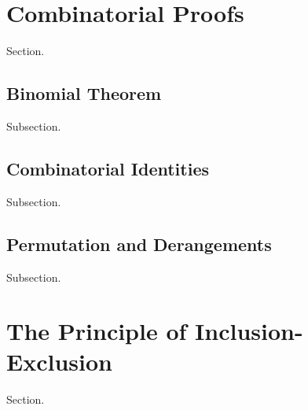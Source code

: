 \section{Combinatorial Proofs}
Section.

\subsection{Binomial Theorem}
Subsection.

\subsection{Combinatorial Identities}
Subsection.

\subsection{Permutation and Derangements}
Subsection.

\section{The Principle of Inclusion-Exclusion}
Section.
